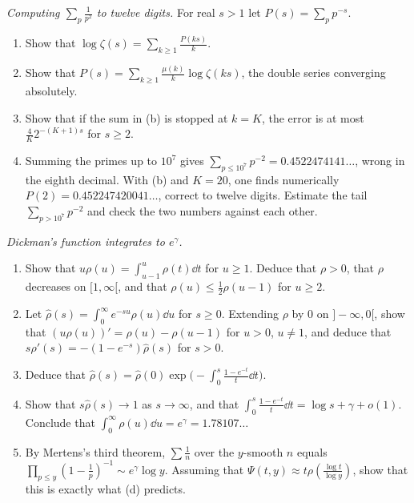 \begin{exercise}[$\star\star$]\label{pb:primezeta}
\emph{Computing $\sum_p\frac1{p^2}$ to twelve digits.} For real $s>1$ let $P(s)=\sum_pp^{-s}$.
\begin{enumerate}[label=(\alph*)]
\item Show that $\log\zeta(s)=\sum_{k\ge1}\frac{P(ks)}k$.
\item Show that $P(s)=\sum_{k\ge1}\frac{\mu(k)}k\log\zeta(ks)$, the double series converging absolutely.
\item Show that if the sum in (b) is stopped at $k=K$, the error is at most $\frac{4}{K}2^{-(K+1)s}$ for $s\ge2$.
\item Summing the primes up to $10^7$ gives $\sum_{p\le10^7}p^{-2}=0.4522474141\ldots$, wrong in the eighth decimal. With (b) and $K=20$, one finds numerically
$P(2)=0.452247420041\ldots$, correct to twelve digits. Estimate the tail $\sum_{p>10^7}p^{-2}$ and check the two numbers against each other.
\end{enumerate}
\end{exercise}

\begin{exercise}[$\star\star\star$]\label{pb:dickmanint}
\emph{Dickman's function integrates to $e^\gamma$.}
\begin{enumerate}[label=(\alph*)]
\item Show that $u\rho(u)=\int_{u-1}^u\rho(t)\dd t$ for $u\ge1$. Deduce that $\rho>0$, that $\rho$ decreases on $[1,\infty[$, and that $\rho(u)\le\frac12\rho(u-1)$ for $u\ge2$.
\item Let $\hat\rho(s)=\int_0^\infty e^{-su}\rho(u)\dd u$ for $s\ge0$. Extending $\rho$ by $0$ on $]-\infty,0[$, show that $(u\rho(u))'=\rho(u)-\rho(u-1)$ for $u>0$, $u\ne1$, and deduce
that $s\hat\rho'(s)=-(1-e^{-s})\hat\rho(s)$ for $s>0$.
\item Deduce that $\hat\rho(s)=\hat\rho(0)\exp\bigl(-\int_0^s\frac{1-e^{-t}}t\dd t\bigr)$.
\item Show that $s\hat\rho(s)\to1$ as $s\to\infty$, and that $\int_0^s\frac{1-e^{-t}}t\dd t=\log s+\gamma+o(1)$. Conclude that $\int_0^\infty\rho(u)\dd u=e^\gamma=1.78107\ldots$
\item By Mertens's third theorem, $\sum\frac1n$ over the $y$-smooth $n$ equals $\prod_{p\le y}(1-\frac1p)^{-1}\sim e^\gamma\log y$. Assuming that $\Psi(t,y)\approx t\rho(\frac{\log t}{\log y})$,
show that this is exactly what (d) predicts.
\end{enumerate}
\end{exercise}

